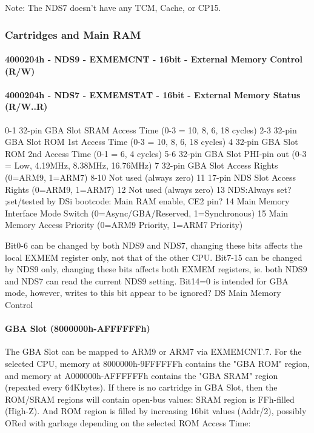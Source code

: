 \documentclass[11pt,a4paper]{proc}
\begin{document}
\begin{flushleft}
Note: The NDS7 doesn't have any TCM, Cache, or CP15.

\subsubsection{Cartridges and Main RAM}

\paragraph{4000204h - NDS9 - EXMEMCNT - 16bit - External Memory Control (R/W)}
\paragraph{4000204h - NDS7 - EXMEMSTAT - 16bit - External Memory Status (R/W..R)}

  0-1   32-pin GBA Slot SRAM Access Time    (0-3 = 10, 8, 6, 18 cycles)
  2-3   32-pin GBA Slot ROM 1st Access Time (0-3 = 10, 8, 6, 18 cycles)
  4     32-pin GBA Slot ROM 2nd Access Time (0-1 = 6, 4 cycles)
  5-6   32-pin GBA Slot PHI-pin out   (0-3 = Low, 4.19MHz, 8.38MHz, 16.76MHz)
  7     32-pin GBA Slot Access Rights     (0=ARM9, 1=ARM7)
  8-10  Not used (always zero)
  11    17-pin NDS Slot Access Rights     (0=ARM9, 1=ARM7)
  12    Not used (always zero)
  13    NDS:Always set?  ;set/tested by DSi bootcode: Main RAM enable, CE2 pin?
  14    Main Memory Interface Mode Switch (0=Async/GBA/Reserved, 1=Synchronous)
  15    Main Memory Access Priority       (0=ARM9 Priority, 1=ARM7 Priority)

Bit0-6 can be changed by both NDS9 and NDS7, changing these bits affects the local EXMEM register only, not that of the other CPU.
Bit7-15 can be changed by NDS9 only, changing these bits affects both EXMEM registers, ie. both NDS9 and NDS7 can read the current NDS9 setting.
Bit14=0 is intended for GBA mode, however, writes to this bit appear to be ignored?
DS Main Memory Control

\paragraph{GBA Slot (8000000h-AFFFFFFh)}
The GBA Slot can be mapped to ARM9 or ARM7 via EXMEMCNT.7.
For the selected CPU, memory at 8000000h-9FFFFFFh contains the "GBA ROM" region, and memory at A000000h-AFFFFFFh contains the "GBA SRAM" region (repeated every 64Kbytes). If there is no cartridge in GBA Slot, then the ROM/SRAM regions will contain open-bus values: SRAM region is FFh-filled (High-Z). And ROM region is filled by increasing 16bit values (Addr/2), possibly ORed with garbage depending on the selected ROM Access Time:


\end{flushleft}
\end{document}
